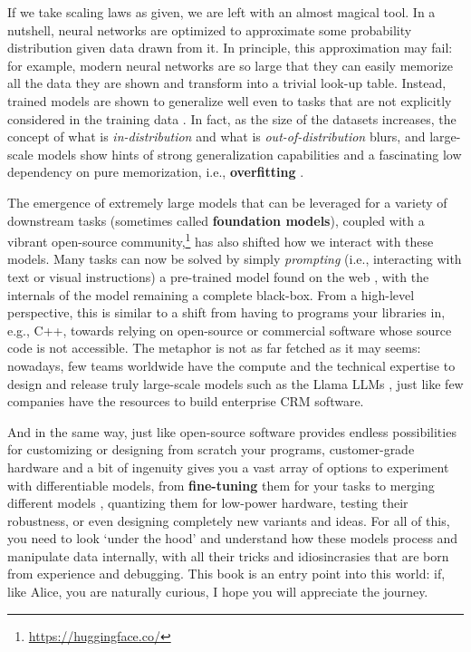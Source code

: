 If we take scaling laws as given, we are left with an almost magical tool. In a nutshell, neural networks are optimized to approximate some probability distribution given data drawn from it. In principle, this approximation may fail: for example, modern neural networks are so large that they can easily memorize all the data they are shown \cite{zhang2021understanding} and transform into a trivial look-up table. Instead, trained models are shown to generalize well even to tasks that are not explicitly considered in the training data \cite{akyurek2022learning}. In fact, as the size of the datasets increases, the concept of what is \textit{in-distribution} and what is \textit{out-of-distribution} blurs, and large-scale models show hints of strong generalization capabilities and a fascinating low dependency on pure memorization, i.e., \textbf{overfitting} \cite{power2022grokking}. 

The emergence of extremely large models that can be leveraged for a variety of downstream tasks (sometimes called \textbf{foundation models}), coupled with a vibrant open-source community,\footnote{\url{https://huggingface.co/}} has also shifted how we interact with these models. Many tasks can now be solved by simply \textit{prompting} (i.e., interacting with text or visual instructions) a pre-trained model found on the web \cite{akyurek2022learning}, with the internals of the model remaining a complete black-box. From a high-level perspective, this is similar to a shift from having to programs your libraries in, e.g., C++, towards relying on open-source or commercial software whose source code is not accessible. The metaphor is not as far fetched as it may seems: nowadays, few teams worldwide have the compute and the technical expertise to design and release truly large-scale models such as the Llama LLMs \cite{touvron2023llama}, just like few companies have the resources to build enterprise CRM software.

And in the same way, just like open-source software provides endless possibilities for customizing or designing from scratch your programs, customer-grade hardware and a bit of ingenuity gives you a vast array of options to experiment with differentiable models, from \textbf{fine-tuning} them for your tasks \cite{liu2022few} to merging different models \cite{ainsworth2022git}, quantizing them for low-power hardware, testing their robustness, or even designing completely new variants and ideas. For all of this, you need to look `under the hood'  and understand how these models process and manipulate data internally, with all their tricks and idiosincrasies that are born from experience and debugging. This book is an entry point into this world: if, like Alice, you are naturally curious, I hope you will appreciate the journey.

